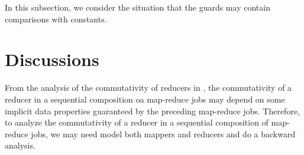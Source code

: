 \documentclass[runningheads,a4paper]{llncs}
\begin{document}
In this subsection, we consider the situation that the guards may contain comparisons with constants.


\section{Discussions}

From the analysis of the commutativity of reducers in \cite{XZZ+14}, the commutativity of a reducer in a sequential composition oa map-reduce jobs may depend on some implicit data properties guaranteed by the preceding map-reduce jobs. Therefore, to analyze the commutativity of a reducer in a sequential composition of map-reduce jobs, we may need model both mappers and reducers and do a backward analysis.





\begin{appendix}



\end{appendix}
\end{document}
